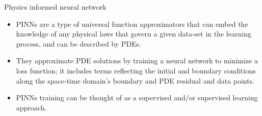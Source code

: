 \begin{frame}{Physics informed neural network}
    \begin{itemize}
        \item PINNs are a type of universal function approximators that can embed the knowledge of any physical laws that govern a given data-set in the learning process, and can be described by PDEs.
        \item They approximate PDE solutions by training a neural network to minimize a loss function; it includes terms reflecting the initial and boundary conditions along the space-time domain’s boundary and PDE residual and data points.
        \item PINNs training can be thought of as a supervised and/or supervised learning approach.
    \end{itemize}

\end{frame}